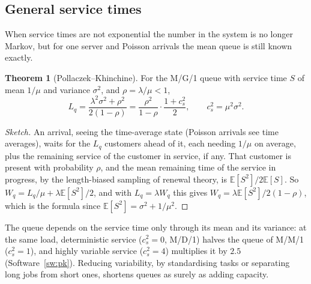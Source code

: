 \documentclass[11pt,a4paper]{article}
\numberwithin{equation}{section}
\theoremstyle{definition}
\newtheorem{thm}{Theorem}[subsection]
\begin{document}
\subsection{General service times}
\label{ssec:mg1}

When service times are not exponential the number in the system is no longer Markov, but for one server and Poisson arrivals the mean queue is still known exactly.

\begin{thm}[Pollaczek--Khinchine]
\label{thm:pk}
For the M/G/1 queue with service time $S$ of mean $1/\mu$ and variance $\sigma^2$, and $\rho = \lambda/\mu < 1$,
\[
L_q = \frac{\lambda^2\sigma^2 + \rho^2}{2(1 - \rho)} = \frac{\rho^2}{1 - \rho}\cdot\frac{1 + c_s^2}2, \qquad c_s^2 = \mu^2\sigma^2 .
\]
\end{thm}

\begin{proof}[Sketch]
An arrival, seeing the time-average state (Poisson arrivals see time averages), waits for the $L_q$ customers ahead of it, each needing $1/\mu$ on average, plus the remaining service of the customer in service, if any. That customer is present with probability $\rho$, and the mean remaining time of the service in progress, by the length-biased
sampling of renewal theory, is $\mathbb E[S^2]/2\mathbb E[S]$. So $W_q = L_q/\mu + \lambda\mathbb E[S^2]/2$, and with $L_q = \lambda W_q$ this gives $W_q = \lambda\mathbb E[S^2]/2(1 - \rho)$, which is the formula since $\mathbb E[S^2] = \sigma^2 + 1/\mu^2$.
\end{proof}

The queue depends on the service time only through its mean and its variance: at the same load, deterministic service ($c_s^2 = 0$, M/D/1) halves the queue of M/M/1 ($c_s^2 = 1$), and highly variable service ($c_s^2 = 4$) multiplies it by $2.5$ (Software~\ref{sw:pk}). Reducing variability, by standardising tasks or separating long jobs from short ones, shortens
queues as surely as adding capacity.
\end{document}
